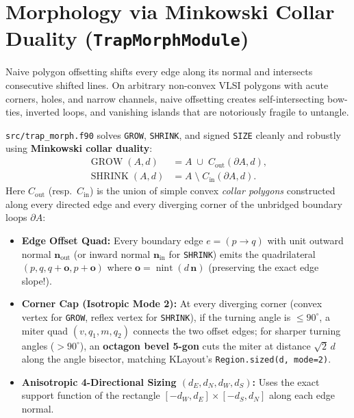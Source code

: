 \section{Morphology via Minkowski Collar Duality (\texttt{TrapMorphModule})}

Naive polygon offsetting shifts every edge along its normal and intersects consecutive shifted lines. On arbitrary non-convex VLSI polygons with acute corners, holes, and narrow channels, naive offsetting creates self-intersecting bow-ties, inverted loops, and vanishing islands that are notoriously fragile to untangle.

\texttt{src/trap\_morph.f90} solves \texttt{GROW}, \texttt{SHRINK}, and signed \texttt{SIZE} cleanly and robustly using \textbf{Minkowski collar duality}:
\begin{align}
  \operatorname{GROW}(A, d)   &= A \;\cup\; C_{\text{out}}(\partial A, d), \label{eq:grow} \\
  \operatorname{SHRINK}(A, d) &= A \;\setminus\; C_{\text{in}}(\partial A, d). \label{eq:shrink}
\end{align}
Here $C_{\text{out}}$ (resp.\ $C_{\text{in}}$) is the union of simple convex \emph{collar polygons} constructed along every directed edge and every diverging corner of the unbridged boundary loops $\partial A$:
\begin{itemize}
  \item \textbf{Edge Offset Quad:} Every boundary edge $e = (p \to q)$ with unit outward normal $\mathbf{n}_{\text{out}}$ (or inward normal $\mathbf{n}_{\text{in}}$ for \texttt{SHRINK}) emits the quadrilateral $(p, q, q + \mathbf{o}, p + \mathbf{o})$ where $\mathbf{o} = \operatorname{nint}(d\,\mathbf{n})$ (preserving the exact edge slope!).
  \item \textbf{Corner Cap (Isotropic Mode 2):} At every diverging corner (convex vertex for \texttt{GROW}, reflex vertex for \texttt{SHRINK}), if the turning angle is $\le 90^\circ$, a miter quad $(v, q_1, m, q_2)$ connects the two offset edges; for sharper turning angles ($> 90^\circ$), an \textbf{octagon bevel 5-gon} cuts the miter at distance $\sqrt{2}\,d$ along the angle bisector, matching KLayout's \texttt{Region.sized(d, mode=2)}.
  \item \textbf{Anisotropic 4-Directional Sizing $(d_E, d_N, d_W, d_S)$:} Uses the exact support function of the rectangle $[-d_W, d_E] \times [-d_S, d_N]$ along each edge normal.
\end{itemize}

